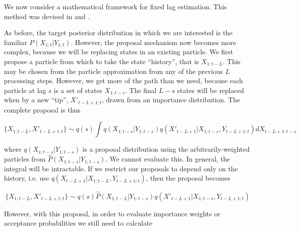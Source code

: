 We now consider a mathematical framework for fixed lag estimation. This method was devised in \cite{Doucet2006} and \cite{Briers2006}.

As before, the target posterior distribution in which we are interested is the familiar $P(X_{1:t}|Y_{1:t})$. However, the proposal mechanism now becomes more complex, because we will be replacing states in an existing particle. We first propose a particle from which to take the state ``history'', that is $X_{1:t-L}$. This may be chosen from the particle approximation from any of the previous $L$ processing steps. However, we get more of the path than we need, because each particle at lag $s$ is a set of states $X_{1:t-s}$. The final $L-s$ states will be replaced when by a new ``tip'', $X'_{t-L+1:t}$, drawn from an importance distribution. The complete proposal is thus

\begin{equation}
\{X_{1:t-L}, X'_{t-L+1:t}\} \sim q(s) \int q(X_{1:t-s}|Y_{1:t-s}) q(X'_{t-L+1}|X_{1:t-s}, Y_{t-L+1:t}) dX_{t-L+1:t-s}
\label{eq:DumbFLProposal1}
\end{equation}

where $q(X_{1:t-s}|Y_{1:t-s})$ is a proposal distribution using the arbitrarily-weighted particles from $\hat{P}(X_{1:t-s}|Y_{1:t-s})$. We cannot evaluate this. In general, the integral will be intractable. If we restrict our proposals to depend only on the history, i.e. use $q(X_{t-L+1}|X_{1:t-L}, Y_{t-L+1:t})$, then the proposal becomes

\begin{equation}
\{X_{1:t-L}, X'_{t-L+1:t}\} \sim q(s) \hat{P}(X_{1:t-L}|Y_{1:t-s}) q(X'_{t-L+1}|X_{1:t-s}, Y_{t-L+1:t})
\label{eq:DumbFLProposal2}
\end{equation}



However, with this proposal, in order to evaluate importance weights or acceptance probabilities we still need to calculate

